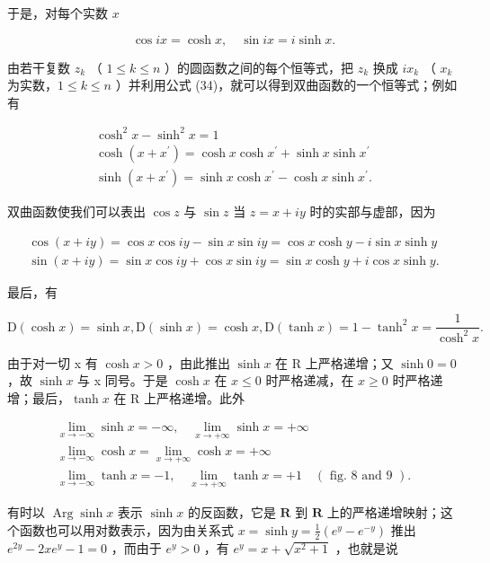 于是，对每个实数 \(x\)

\[
\cos i x = \cosh x, \quad \sin i x = i \sinh x.\tag{34}
\]

由若干复数 \(z_{k}\) （ \(1 \leqslant k \leqslant n\) ）的圆函数之间的每个恒等式，把 \(z_{k}\) 换成 \(ix_{k}\) （ \(x_{k}\) 为实数，\(1 \leqslant k \leqslant n\) ）并利用公式 (34)，就可以得到双曲函数的一个恒等式；例如有

\[
\begin{array}{c} \cosh^ {2} x - \sinh^ {2} x = 1 \\ \cosh (x + x ^ {\prime}) = \cosh x \cosh x ^ {\prime} + \sinh x \sinh x ^ {\prime} \\ \sinh (x + x ^ {\prime}) = \sinh x \cosh x ^ {\prime} - \cosh x \sinh x ^ {\prime}. \end{array}
\]

双曲函数使我们可以表出 \(\cos z\) 与 \(\sin z\) 当 \(z = x + iy\) 时的实部与虚部，因为

\[
\begin{array}{l} \cos (x + i y) = \cos x \cos i y - \sin x \sin i y = \cos x \cosh y - i \sin x \sinh y \\ \sin (x + i y) = \sin x \cos i y + \cos x \sin i y = \sin x \cosh y + i \cos x \sinh y. \end{array}
\]

最后，有

\[
\mathrm{D} (\cosh x) = \sinh x, \mathrm{D} (\sinh x) = \cosh x, \mathrm{D} (\tanh x) = 1 - \tanh ^ {2} x = \frac {1}{\cosh^ {2} x}.
\]

由于对一切 x 有 \(\cosh x > 0\) ，由此推出 \(\sinh x\) 在 R 上严格递增；又 \(\sinh 0 = 0\) ，故 \(\sinh x\) 与 x 同号。于是 \(\cosh x\) 在 \(x \leqslant 0\) 时严格递减，在 \(x \geqslant 0\) 时严格递增；最后，\(\tanh x\) 在 R 上严格递增。此外

\[
\begin{array}{l} \lim _ {x \to - \infty} \sinh x = - \infty , \quad \lim _ {x \to + \infty} \sinh x = + \infty \\ \lim _ {x \to - \infty} \cosh x = \lim _ {x \to + \infty} \cosh x = + \infty \\ \lim _ {x \to - \infty} \tanh x = - 1, \quad \lim _ {x \to + \infty} \tanh x = + 1 \quad (\text {   fig.   8   and   9   }). \end{array}
\]

有时以 \(\operatorname{Arg}\sinh x\) 表示 \(\sinh x\) 的反函数，它是 \(\mathbf{R}\) 到 \(\mathbf{R}\) 上的严格递增映射；这个函数也可以用对数表示，因为由关系式 \(x = \sinh y = \frac{1}{2}(e^y - e^{-y})\) 推出 \(e^{2y} - 2xe^y - 1 = 0\) ，而由于 \(e^y > 0\) ，有 \(e^y = x + \sqrt{x^2 + 1}\) ，也就是说

